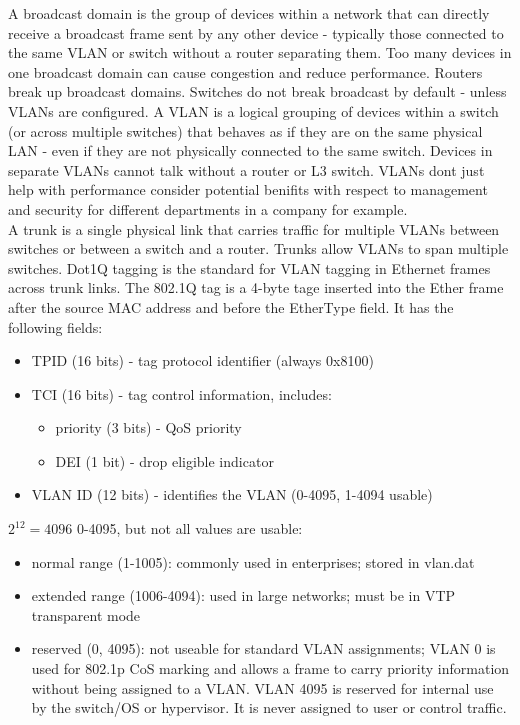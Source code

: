 \documentclass{article}
\begin{document}
A broadcast domain is the group of devices within a network that can directly receive a broadcast frame sent by any other device - typically those connected to the same VLAN or switch without a router separating them. Too many devices in one broadcast domain can cause congestion and reduce performance. Routers break up broadcast domains. Switches do not break broadcast by default - unless VLANs are configured. A VLAN is a logical grouping of devices within a switch (or across multiple switches) that behaves as if they are on the same physical LAN - even if they are not physically connected to the same switch. Devices in separate VLANs cannot talk without a router or L3 switch. VLANs dont just help with performance consider potential benifits with respect to management and security for different departments in a company for example.\\

A trunk is a single physical link that carries traffic for multiple VLANs between switches or between a switch and a router. Trunks allow VLANs to span multiple switches. Dot1Q tagging is the standard for VLAN tagging in Ethernet frames across trunk links. The 802.1Q tag is a 4-byte tage inserted into the Ether frame after the source MAC address and before the EtherType field. It has the following fields: 
	\begin{itemize}	
		\item TPID (16 bits) - tag protocol identifier (always 0x8100)
		\item TCI (16 bits) - tag control information, includes:
			\begin{itemize}
				\item priority (3 bits) - QoS priority
				\item DEI (1 bit) - drop eligible indicator
			\end{itemize}
		\item VLAN ID (12 bits) - identifies the VLAN (0-4095, 1-4094 usable)
	\end{itemize}

$2^12 = 4096$ 0-4095, but not all values are usable:
	\begin{itemize}
		\item normal range (1-1005): commonly used in enterprises; stored in vlan.dat
		\item extended range (1006-4094): used in large networks; must be in VTP transparent mode
		\item reserved (0, 4095): not useable for standard VLAN assignments; VLAN 0 is used for 802.1p CoS marking and allows a frame to carry priority information without being assigned to a VLAN. VLAN 4095 is reserved for internal use by the switch/OS or hypervisor. It is never assigned to user or control traffic.
	\end{itemize}
\end{document}
